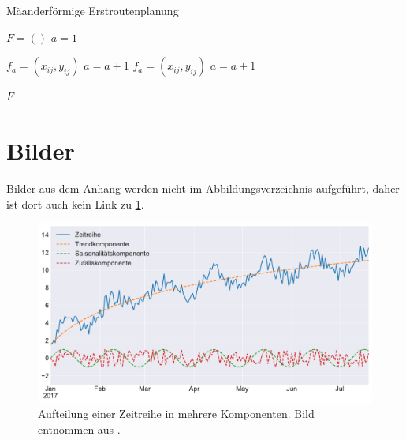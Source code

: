 \begin{algorithm}
  \caption{Mäanderförmige Erstroutenplanung}
  \label{alg:erstroutenplanung-anhang}
  \begin{algorithmic}[1]
    \State $F=()$
    \State $a=1$

          \State $f_a = (x_{ij}, y_{ij})$
          \State $a=a+1$
        \EndFor
      \Else
          \State $f_a = (x_{ij}, y_{ij})$
          \State $a=a+1$
        \EndFor
      \EndIf
    \EndFor

    \State \Return $F$

    \EndProcedure
  \end{algorithmic}
\end{algorithm}

\section{Bilder}

Bilder aus dem Anhang werden nicht im Abbildungsverzeichnis aufgeführt, daher ist dort auch kein Link zu \ref{fig:zeitreihe-komponenten4}.

\begin{figure}[h]
  \centering
  \includegraphics[width=\textwidth]{bilder/02-hauptteil/zeitreihe-komponenten.pdf}
  \caption[Aufteilung einer Zeitreihe in mehrere Komponenten]{Aufteilung einer Zeitreihe in mehrere Komponenten. Bild entnommen aus \citet{Masterthesis.2017}.}
  \label{fig:zeitreihe-komponenten4}
\end{figure}

